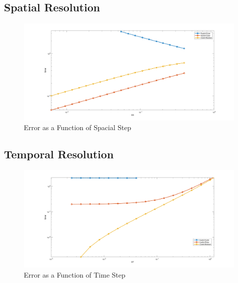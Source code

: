 \documentclass[10pt, letter, showtrims]{extarticle}
\begin{document}
		\pagebreak
		
		\subsection{Spatial Resolution}
		
		\FloatBarrier
		\begin{figure}[h]
			\centering
			\captionsetup{justification=centering}
			\includegraphics[width=\linewidth]{"Figures/MATLAB/ConstantDTSource"}
			\caption{Error as a Function of Spacial Step}
			\label{fig:explicit}
		\end{figure}		
		\FloatBarrier
		
		\pagebreak
		
		\subsection{Temporal Resolution}
		
		\FloatBarrier
		\begin{figure}[h]
			\centering
			\captionsetup{justification=centering}
			\includegraphics[width=\linewidth]{"Figures/MATLAB/ConstantDXSource"}
			\caption{Error as a Function of Time Step}
			\label{fig:explicit}
		\end{figure}		
		\FloatBarrier
		
		\pagebreak
		
\end{document}
